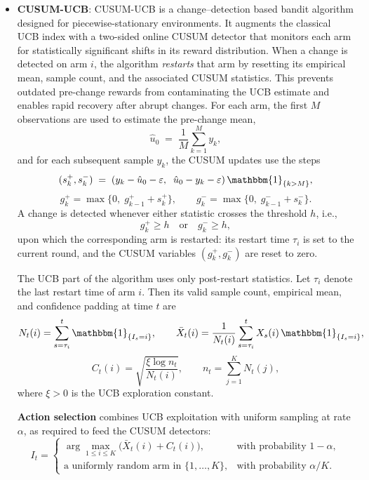 \documentclass{scrartcl}
\begin{document}
\begin{itemize}
The additive term
\[
    \frac{e{\alpha}}{K}\sum_{i=1}^K w_i(t)
\]
helps the algorithm adapt to environments where the best arm switches,
enabling regret bounds that depend on the number of switches rather than on~$T$ alone.


\item \textbf{CUSUM-UCB}\cite{cusumucb}:
CUSUM-UCB is a change–detection based bandit algorithm designed for
piecewise-stationary environments. It augments the classical UCB index
with a two-sided online CUSUM detector that monitors each arm for
statistically significant shifts in its reward distribution. When a
change is detected on arm $i$, the algorithm \emph{restarts} that arm by
resetting its empirical mean, sample count, and the associated CUSUM
statistics. This prevents outdated pre-change rewards from contaminating
the UCB estimate and enables rapid recovery after abrupt changes.
For each arm, the first $M$ observations are used to estimate the
pre-change mean,
\[
\hat u_0 \;=\; \frac{1}{M}\sum_{k=1}^{M} y_k,
\]
and for each subsequent sample $y_k$, the CUSUM updates use the steps
\[
(s_k^+, s_k^-) \;=\; (y_k - \hat u_0 - \varepsilon,\;\; \hat u_0 - y_k - \varepsilon)\,\mathbbm{1}_{\{k > M\}},
\]
\[
g_k^+ = \max\{0,\; g_{k-1}^+ + s_k^+\}, \qquad 
g_k^- = \max\{0,\; g_{k-1}^- + s_k^-\}.
\]
A change is detected whenever either statistic crosses the threshold $h$,
i.e.,
\[
g_k^+ \ge h \quad \text{or} \quad g_k^- \ge h,
\]
upon which the corresponding arm is restarted:
its restart time $\tau_i$ is set to the current round, and the CUSUM
variables $(g_k^+, g_k^-)$ are reset to zero.

The UCB part of the algorithm uses only post-restart statistics.
Let $\tau_i$ denote the last restart time of arm $i$. Then its valid
sample count, empirical mean, and confidence padding at time $t$ are
\[
N_t(i) = \sum_{s=\tau_i}^{t} \mathbbm{1}_{\{I_s = i\}}, \qquad
\bar X_t(i) = \frac{1}{N_t(i)}\sum_{s=\tau_i}^{t} X_s(i)\,\mathbbm{1}_{\{I_s = i\}},
\]
\[
C_t(i) = \sqrt{\frac{\xi \log n_t}{N_t(i)}}, \qquad
n_t = \sum_{j=1}^{K} N_t(j),
\]
where $\xi > 0$ is the UCB exploration constant.

\textbf{Action selection} combines UCB exploitation with uniform
sampling at rate $\alpha$, as required to feed the CUSUM detectors:
\[
I_t = 
\begin{cases}
\displaystyle \arg\max_{1\le i\le K}\bigl(\bar X_t(i) + C_t(i)\bigr), & \text{with probability } 1 - \alpha,\\[8pt]
\text{a uniformly random arm in }\{1,\dots,K\}, & \text{with probability } \alpha/K.
\end{cases}
\]


\end{itemize}
\end{document}

